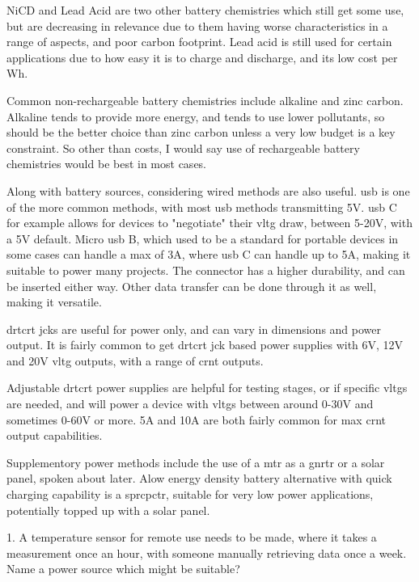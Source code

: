 \documentclass[a4paper,11pt]{report}
\newcommand{\Quiz}[1] %
{
\par\noindent %
\phantomsection %
\todo[inline, color=blue!30]{\textbf{#1}} %
\vspace{1em} %
}
\begin{document}
NiCD and Lead Acid are two other battery chemistries which still get some use, but are decreasing in relevance due to them having worse characteristics in a range of aspects, and poor carbon footprint. Lead acid is still used for certain applications due to how easy it is to charge and discharge, and its low cost per Wh.

Common non-rechargeable battery chemistries include alkaline and zinc carbon. Alkaline tends to provide more energy, and tends to use lower pollutants, so should be the better choice than zinc carbon unless a very low budget is a key constraint. So other than costs, I would say use of rechargeable battery chemistries would be best in most cases.

Along with battery sources, considering wired methods are also useful. \gls{usb} is one of the more common methods, with most \gls{usb} methods transmitting 5V. \gls{usb} C for example allows for devices to "negotiate" their \gls{vltg} draw, between 5-20V, with a 5V default. Micro \gls{usb} B, which used to be a standard for portable devices in some cases can handle a max of 3A, where \gls{usb} C can handle up to 5A, making it suitable to power many projects. The connector has a higher durability, and can be inserted either way. Other data transfer can be done through it as well, making it versatile.

\gls{drtcrt} \gls{jck}s are useful for power only, and can vary in dimensions and power output. It is fairly common to get \gls{drtcrt} \gls{jck} based power supplies with 6V, 12V and 20V \gls{vltg} outputs, with a range of \gls{crnt} outputs.

Adjustable \gls{drtcrt} power supplies are helpful for testing stages, or if specific \gls{vltg}s are needed, and will power a device with \gls{vltg}s between around 0-30V and sometimes 0-60V or more. 5A and 10A are both fairly common for max \gls{crnt} output capabilities.

Supplementory power methods include the use of a \gls{mtr} as a \gls{gnrtr} or a solar panel, spoken about later. Alow energy density battery alternative with quick charging capability is a \gls{sprcpctr}, suitable for very low power applications, potentially topped up with a solar panel.

\Quiz{Quiz}

1. A temperature sensor for remote use needs to be made, where it takes a measurement once an hour, with someone manually retrieving data once a week. Name a power source which might be suitable?
\end{document}
